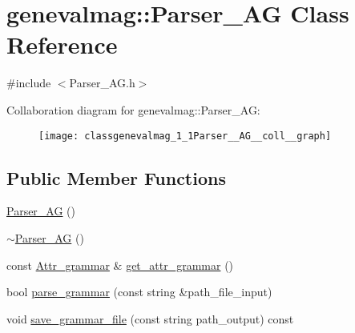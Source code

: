 \hypertarget{classgenevalmag_1_1Parser__AG}{
\section{genevalmag::Parser\_\-AG Class Reference}
\label{classgenevalmag_1_1Parser__AG}
}


{\ttfamily \#include $<$Parser\_\-AG.h$>$}



Collaboration diagram for genevalmag::Parser\_\-AG:\nopagebreak
\begin{figure}[H]
\begin{center}
\leavevmode
\texttt{[image: classgenevalmag\_1\_1Parser\_\_AG\_\_coll\_\_graph]}
\end{center}
\end{figure}
\subsection*{Public Member Functions}
\begin{DoxyCompactItemize}
\item 
\hyperlink{classgenevalmag_1_1Parser__AG_a107da8e92db8c44204471982619ff339}{Parser\_\-AG} ()
\item 
\hyperlink{classgenevalmag_1_1Parser__AG_a834ddbb83e5822f485d16cdc432762cf}{$\sim$Parser\_\-AG} ()
\item 
const \hyperlink{classgenevalmag_1_1Attr__grammar}{Attr\_\-grammar} \& \hyperlink{classgenevalmag_1_1Parser__AG_ac6b25c2c2cb50461c50ba50c186a3b42}{get\_\-attr\_\-grammar} ()
\item 
bool \hyperlink{classgenevalmag_1_1Parser__AG_a2eda33cb61d0bb2430557ebcad714a10}{parse\_\-grammar} (const string \&path\_\-file\_\-input)
\item 
void \hyperlink{classgenevalmag_1_1Parser__AG_af583d86ffaf791aced12471108590890}{save\_\-grammar\_\-file} (const string path\_\-output) const 
\end{DoxyCompactItemize}
